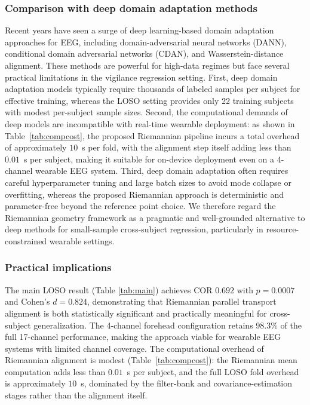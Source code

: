 \documentclass[journal,twoside,web]{ieeecolor2}
\begin{document}
\subsubsection{Comparison with deep domain adaptation methods}
Recent years have seen a surge of deep learning-based domain adaptation
approaches for EEG, including domain-adversarial neural networks
(DANN), conditional domain adversarial networks (CDAN), and
Wasserstein-distance alignment. These methods are powerful for
high-data regimes but face several practical limitations in the
vigilance regression setting. First, deep domain adaptation models
typically require thousands of labeled samples per subject for
effective training, whereas the LOSO setting provides only 22
training subjects with modest per-subject sample sizes. Second, the
computational demands of deep models are incompatible with real-time
wearable deployment: as shown in Table~\ref{tab:compcost}, the
proposed Riemannian pipeline incurs a total overhead of approximately
$10$~s per fold, with the alignment step itself adding less than
$0.01$~s per subject, making it suitable for on-device deployment
even on a 4-channel wearable EEG system. Third, deep domain
adaptation often requires careful hyperparameter tuning and large
batch sizes to avoid mode collapse or overfitting, whereas the
proposed Riemannian approach is deterministic and parameter-free
beyond the reference point choice. We therefore regard the
Riemannian geometry framework as a pragmatic and well-grounded
alternative to deep methods for small-sample cross-subject
regression, particularly in resource-constrained wearable settings.

\subsubsection{Practical implications} The main LOSO result (Table
\ref{tab:main}) achieves COR $0.692$ with $p=0.0007$ and Cohen's
$d=0.824$, demonstrating that Riemannian parallel transport alignment
is both statistically significant and practically meaningful for
cross-subject generalization. The 4-channel forehead configuration
retains 98.3\% of the full 17-channel performance, making the approach
viable for wearable EEG systems with limited channel coverage.
The computational overhead of Riemannian alignment is modest
(Table~\ref{tab:compcost}): the Riemannian mean computation adds
less than $0.01$~s per subject, and the full LOSO fold overhead is
approximately $10$~s, dominated by the filter-bank and
covariance-estimation stages rather than the alignment itself.
\end{document}
